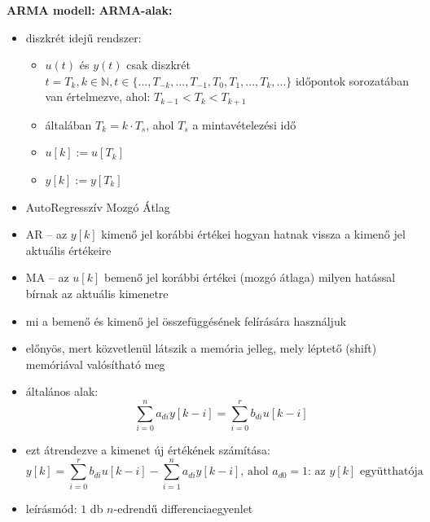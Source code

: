 \textbf{ARMA modell:}
\noindent \textbf{ARMA-alak:}
\begin{itemize}
    \item diszkrét idejű rendszer:
    \begin{itemize}
        \item $u(t)$ és $y(t)$ csak diszkrét $t = T_k, k \in \mathbb{N}, t \in \{..., T_{-k}, ..., T_{-1}, T_0, T_1, ..., T_k, ...\}$ időpontok sorozatában van értelmezve, ahol: $T_{k-1} < T_k < T_{k+1}$
        \item általában $T_k = k \cdot T_s$, ahol $T_s$ a mintavételezési idő
        \item $u[k] := u[T_k]$
        \item $y[k] := y[T_k]$
    \end{itemize}
    \item AutoRegresszív Mozgó Átlag
    \item AR – az $y[k]$ kimenő jel korábbi értékei hogyan hatnak vissza a kimenő jel aktuális értékeire
    \item MA – az $u[k]$ bemenő jel korábbi értékei (mozgó átlaga) milyen hatással bírnak az aktuális kimenetre
    \item mi a bemenő és kimenő jel összefüggésének felírására használjuk
    \item előnyös, mert közvetlenül látszik a memória jelleg, mely léptető (shift) memóriával valósítható meg
    \item általános alak:
    $$ \sum_{i=0}^{n} a_{di} y[k-i] = \sum_{i=0}^{r} b_{di} u[k-i] $$
    \item ezt átrendezve a kimenet új értékének számítása:
    $$ y[k] = \sum_{i=0}^{r} b_{di} u[k-i] - \sum_{i=1}^{n} a_{di} y[k-i] \text{, ahol } a_{d0} = 1 \text{: az } y[k] \text{ együtthatója} $$
    \item leírásmód: $1$ db $n$-edrendű differenciaegyenlet
\end{itemize}

